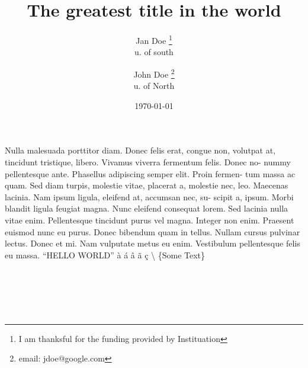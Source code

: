 \documentclass[12pt, twoside]{book}
\title{The greatest title in the world}
\author{Jan Doe \thanks{I am thanksful for the funding provided by Instituation}\\u. of south \and John Doe \thanks{email: jdoe@google.com}\\u. of North}
\date{\today}
\begin{document}
\maketitle

Nulla malesuada porttitor diam. Donec felis erat, congue non, volutpat at,
tincidunt tristique, libero. Vivamus viverra fermentum felis. Donec no-
nummy pellentesque ante. Phasellus adipiscing semper elit. Proin fermen-
tum massa ac quam. Sed diam turpis, molestie vitae, placerat a, molestie
nec, leo. Maecenas lacinia.\vspace{4cm} Nam ipsum ligula, eleifend at, accumsan nec, su-
scipit a,\hspace{4cm} ipsum. Morbi blandit ligula feugiat magna. Nunc eleifend consequat
lorem. Sed lacinia nulla vitae enim. Pellentesque tincidunt purus vel magna.
Integer non enim. Praesent euismod nunc eu purus. Donec bibendum quam
in tellus. Nullam cursus pulvinar lectus. Donec et mi. Nam vulputate metus
eu enim. Vestibulum pellentesque felis eu massa. ``HELLO WORLD''
\` a
\' a
\^ a
\~ a
\c c
\textbackslash
\{Some Text\}
\begin{quote}
    \textit{\lipsum[2]}
\end{quote}

\\
\\
\\
\\
\thisfancypage{
    \setlength{\fboxsep}{10pt}
    \setlength{\shadowsize}{5pt}
    \shadowbox
    }{}

 \begin{tcolorbox}[colback=green!60, colframe=red!70, coltext= yellow!90, title=remark]
 \lipsum[4]
 \end{tcolorbox}   


\clearpage
\end{document}
